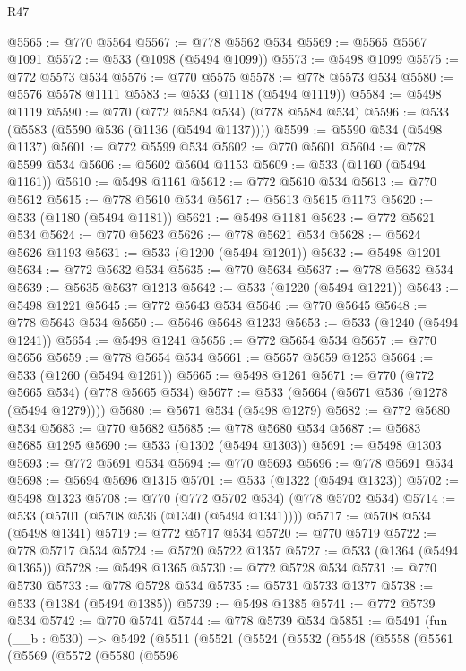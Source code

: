 \begin{lexlean}{R47}
\begin{coremodule}
@5565 := @770 @5564
@5567 := @778 @5562 @534
@5569 := @5565 @5567 @1091
@5572 := @533 (@1098 (@5494 @1099))
@5573 := @5498 @1099
@5575 := @772 @5573 @534
@5576 := @770 @5575
@5578 := @778 @5573 @534
@5580 := @5576 @5578 @1111
@5583 := @533 (@1118 (@5494 @1119))
@5584 := @5498 @1119
@5590 := @770 (@772 @5584 @534) (@778 @5584 @534)
@5596 := @533 (@5583 (@5590 @536 (@1136 (@5494 @1137))))
@5599 := @5590 @534 (@5498 @1137)
@5601 := @772 @5599 @534
@5602 := @770 @5601
@5604 := @778 @5599 @534
@5606 := @5602 @5604 @1153
@5609 := @533 (@1160 (@5494 @1161))
@5610 := @5498 @1161
@5612 := @772 @5610 @534
@5613 := @770 @5612
@5615 := @778 @5610 @534
@5617 := @5613 @5615 @1173
@5620 := @533 (@1180 (@5494 @1181))
@5621 := @5498 @1181
@5623 := @772 @5621 @534
@5624 := @770 @5623
@5626 := @778 @5621 @534
@5628 := @5624 @5626 @1193
@5631 := @533 (@1200 (@5494 @1201))
@5632 := @5498 @1201
@5634 := @772 @5632 @534
@5635 := @770 @5634
@5637 := @778 @5632 @534
@5639 := @5635 @5637 @1213
@5642 := @533 (@1220 (@5494 @1221))
@5643 := @5498 @1221
@5645 := @772 @5643 @534
@5646 := @770 @5645
@5648 := @778 @5643 @534
@5650 := @5646 @5648 @1233
@5653 := @533 (@1240 (@5494 @1241))
@5654 := @5498 @1241
@5656 := @772 @5654 @534
@5657 := @770 @5656
@5659 := @778 @5654 @534
@5661 := @5657 @5659 @1253
@5664 := @533 (@1260 (@5494 @1261))
@5665 := @5498 @1261
@5671 := @770 (@772 @5665 @534) (@778 @5665 @534)
@5677 := @533 (@5664 (@5671 @536 (@1278 (@5494 @1279))))
@5680 := @5671 @534 (@5498 @1279)
@5682 := @772 @5680 @534
@5683 := @770 @5682
@5685 := @778 @5680 @534
@5687 := @5683 @5685 @1295
@5690 := @533 (@1302 (@5494 @1303))
@5691 := @5498 @1303
@5693 := @772 @5691 @534
@5694 := @770 @5693
@5696 := @778 @5691 @534
@5698 := @5694 @5696 @1315
@5701 := @533 (@1322 (@5494 @1323))
@5702 := @5498 @1323
@5708 := @770 (@772 @5702 @534) (@778 @5702 @534)
@5714 := @533 (@5701 (@5708 @536 (@1340 (@5494 @1341))))
@5717 := @5708 @534 (@5498 @1341)
@5719 := @772 @5717 @534
@5720 := @770 @5719
@5722 := @778 @5717 @534
@5724 := @5720 @5722 @1357
@5727 := @533 (@1364 (@5494 @1365))
@5728 := @5498 @1365
@5730 := @772 @5728 @534
@5731 := @770 @5730
@5733 := @778 @5728 @534
@5735 := @5731 @5733 @1377
@5738 := @533 (@1384 (@5494 @1385))
@5739 := @5498 @1385
@5741 := @772 @5739 @534
@5742 := @770 @5741
@5744 := @778 @5739 @534
@5851 := @5491
    (fun (__b : @530) =>
    @5492
      (@5511
        (@5521
          (@5524
            (@5532
              (@5548
                (@5558
                  (@5561
                    (@5569
                      (@5572
                        (@5580
                          (@5596

\end{coremodule}
\end{lexlean}
